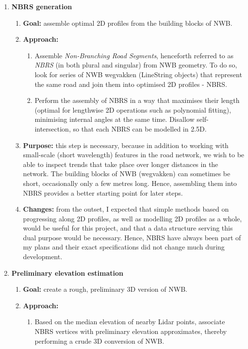 \begin{enumerate}
    \item \textbf{NBRS generation}
    \begin{enumerate}
        \item \textbf{Goal:} assemble optimal 2D profiles from the building blocks of NWB.
        \item \textbf{Approach:}
        \begin{enumerate}
            \item Assemble \textit{Non-Branching Road Segments}, henceforth referred to as \textit{NBRS} (in both plural and singular) from NWB geometry. To do so, look for series of NWB wegvakken (LineString objects) that represent the same road and join them into optimised 2D profiles - NBRS.
            \item Perform the assembly of NBRS in a way that maximises their length (optimal for lengthwise 2D operations such as polynomial fitting), minimising internal angles at the same time. Disallow self-intersection, so that each NBRS can be modelled in 2.5D.
        \end{enumerate}
        \item \textbf{Purpose:} this step is necessary, because in addition to working with small-scale (short wavelength) features in the road network, we wish to be able to inspect trends that take place over longer distances in the network. The building blocks of NWB (wegvakken) can sometimes be short, occasionally only a few metres long. Hence, assembling them into NBRS provides a better starting point for later steps.
        \item \textbf{Changes:} from the outset, I expected that simple methods based on progressing along 2D profiles, as well as modelling 2D profiles as a whole, would be useful for this project, and that a data structure serving this dual purpose would be necessary. Hence, NBRS have always been part of my plans and their exact specifications did not change much during development.
    \end{enumerate}
    \item \textbf{Preliminary elevation estimation}
    \begin{enumerate}
        \item \textbf{Goal:} create a rough, preliminary 3D version of NWB.
        \item \textbf{Approach:}
        \begin{enumerate}
            \item Based on the median elevation of nearby Lidar points, associate NBRS vertices with preliminary elevation approximates, thereby performing a crude 3D conversion of NWB.

\end{enumerate}
\end{enumerate}
\end{enumerate}
